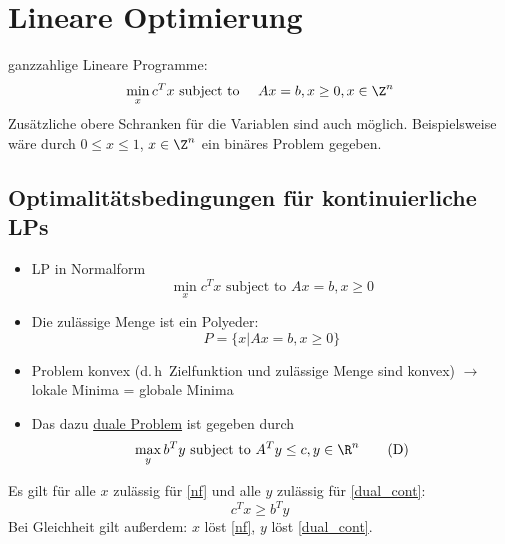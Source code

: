 \section{Lineare Optimierung}
ganzzahlige Lineare Programme:
\begin{equation*}
	\min_{x} c^Tx \text{ subject to } \quad Ax = b, x \geq 0, x \in \Z^n
\end{equation*}
Zusätzliche obere Schranken für die Variablen sind auch möglich.
Beispielsweise wäre durch $0 \leq x \leq 1$, $x \in \Z^n$ ein binäres Problem gegeben.
\subsection{Optimalitätsbedingungen für kontinuierliche LPs}
\begin{itemize}
	\item LP in Normalform
		\begin{equation}\label{nf}
			\min_{x} c^Tx \text{ subject to } Ax = b, x\geq 0\tag{P}
		\end{equation}
	\item Die zulässige Menge ist ein Polyeder:
		\begin{equation*}
			P = \{ x | Ax = b ,x \geq 0 \}
		\end{equation*}
  \item Problem konvex (d.\,h\ Zielfunktion und zulässige Menge sind konvex) $\to$	lokale Minima = globale Minima
  \item Das dazu \underline{duale Problem} ist gegeben durch
		\begin{equation*}\label{dual_cont}
			\max_{y}b^Ty \text{ subject to } A^Ty \leq c, y \in \R^n \tag{D}
		\end{equation*}
\end{itemize}
\begin{lemma} \label{thm:schwache_dualitat}
		Es gilt für alle $x$ zulässig für \eqref{nf} und alle $y$ zulässig für \eqref{dual_cont}:
		\begin{equation*}
			c^Tx \geq b^Ty
		\end{equation*}
		Bei Gleichheit gilt außerdem: $x$ löst \eqref{nf}, $y$ löst \eqref{dual_cont}.
\end{lemma} %
